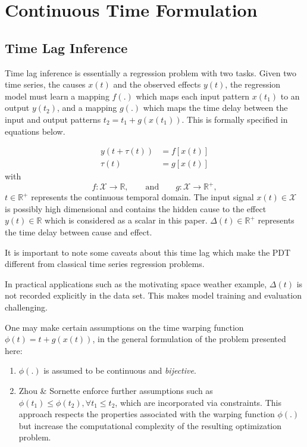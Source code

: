 \documentclass[envcountsect,runningheads]{llncs}
\theoremstyle{etoile}
\begin{document}
\section{Continuous Time Formulation}\label{sec:formulation}

\subsection{Time Lag Inference}

Time lag inference is essentially a regression problem with two tasks. 
Given two time series, the causes $x(t)$ and the observed effects $y(t)$, the regression model 
must learn a mapping $f(.)$ which maps each input pattern $x(t_1)$ to an output $y(t_2)$, and a 
mapping $g(.)$ which maps the time delay between the input and output patterns $t_2 = t_1 + g(x(t_1))$. 
This is formally specified in equations below.

\begin{align}
y(t + \tau(t)) & = f[x(t)]\label{eq:pb1}\\
\tau(t) & = g[x(t)]\label{eq:pb2} 
\end{align}
with
\[
f: \mathcal{X}  \rightarrow \mathbb{R},\qquad\text{and}\qquad
g: \mathcal{X}  \rightarrow \mathbb{R}^{+},
\]
$t \in \mathbb{R}^{+}$ represents the continuous temporal domain. The input signal 
$x(t)\in \mathcal{X}$ is possibly high dimensional and contains the hidden cause to 
the effect $y(t)\in\mathbb{R}$ which is considered as a scalar in this paper. 
$\Delta(t)\in \mathbb{R}^+$ represents the time delay between cause and effect.

It is important to note some caveats about this time lag which make the PDT different from 
classical time series regression problems.

In practical applications such as the motivating space weather example, $\Delta(t)$ is not recorded 
explicitly in the data set. This makes model training and evaluation challenging.

One may make certain assumptions on the time warping function $\phi(t) = t + g(x(t))$, in the general 
formulation of the problem presented here: 

\begin{enumerate}
    \item $\phi(.)$ is assumed to be continuous and \emph{bijective}.
    \item Zhou \& Sornette \cite{ZHOU2006195} enforce further assumptions such as 
          $\phi(t_1) \leq \phi(t_2), \forall t_1 \leq t_2$, which are incorporated via constraints. 
          This approach respects the properties associated with the warping function $\phi(.)$ but 
          increase the computational complexity of the resulting optimization problem.
\end{enumerate}
\end{document}
